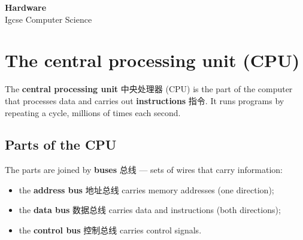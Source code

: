 \documentclass[11pt]{article}
\begin{document}
\begin{center}
  {\LARGE\bfseries Hardware}\\[0.35em]
  {\large Igcse Computer Science}
\end{center}
\vspace{0.6em}

\section*{The central processing unit (CPU)}

The \textbf{central processing unit} 中央处理器 (CPU) is the part of the computer that processes data and carries out \textbf{instructions} 指令. It runs programs by repeating a cycle, millions of times each second.

\subsection*{Parts of the CPU}

\begin{center}
\end{center}

The parts are joined by \textbf{buses} 总线 — sets of wires that carry information:

\begin{itemize}
\item the \textbf{address bus} 地址总线 carries memory addresses (one direction);

\item the \textbf{data bus} 数据总线 carries data and instructions (both directions);

\item the \textbf{control bus} 控制总线 carries control signals.

\end{itemize}
\end{document}
